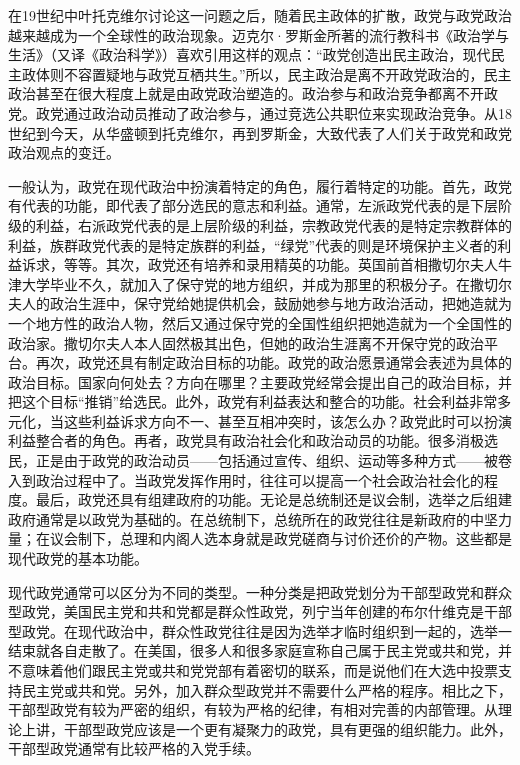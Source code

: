 在19世纪中叶托克维尔讨论这一问题之后，随着民主政体的扩散，政党与政党政治越来越成为一个全球性的政治现象。迈克尔·罗斯金所著的流行教科书《政治学与生活》（又译《政治科学》）喜欢引用这样的观点：“政党创造出民主政治，现代民主政体则不容置疑地与政党互栖共生。”所以，民主政治是离不开政党政治的，民主政治甚至在很大程度上就是由政党政治塑造的。政治参与和政治竞争都离不开政党。政党通过政治动员推动了政治参与，通过竞选公共职位来实现政治竞争。从18世纪到今天，从华盛顿到托克维尔，再到罗斯金，大致代表了人们关于政党和政党政治观点的变迁。

一般认为，政党在现代政治中扮演着特定的角色，履行着特定的功能。首先，政党有代表的功能，即代表了部分选民的意志和利益。通常，左派政党代表的是下层阶级的利益，右派政党代表的是上层阶级的利益，宗教政党代表的是特定宗教群体的利益，族群政党代表的是特定族群的利益，“绿党”代表的则是环境保护主义者的利益诉求，等等。其次，政党还有培养和录用精英的功能。英国前首相撒切尔夫人牛津大学毕业不久，就加入了保守党的地方组织，并成为那里的积极分子。在撒切尔夫人的政治生涯中，保守党给她提供机会，鼓励她参与地方政治活动，把她造就为一个地方性的政治人物，然后又通过保守党的全国性组织把她造就为一个全国性的政治家。撒切尔夫人本人固然极其出色，但她的政治生涯离不开保守党的政治平台。再次，政党还具有制定政治目标的功能。政党的政治愿景通常会表述为具体的政治目标。国家向何处去？方向在哪里？主要政党经常会提出自己的政治目标，并把这个目标“推销”给选民。此外，政党有利益表达和整合的功能。社会利益非常多元化，当这些利益诉求方向不一、甚至互相冲突时，该怎么办？政党此时可以扮演利益整合者的角色。再者，政党具有政治社会化和政治动员的功能。很多消极选民，正是由于政党的政治动员——包括通过宣传、组织、运动等多种方式——被卷入到政治过程中了。当政党发挥作用时，往往可以提高一个社会政治社会化的程度。最后，政党还具有组建政府的功能。无论是总统制还是议会制，选举之后组建政府通常是以政党为基础的。在总统制下，总统所在的政党往往是新政府的中坚力量；在议会制下，总理和内阁人选本身就是政党磋商与讨价还价的产物。这些都是现代政党的基本功能。

现代政党通常可以区分为不同的类型。一种分类是把政党划分为干部型政党和群众型政党，美国民主党和共和党都是群众性政党，列宁当年创建的布尔什维克是干部型政党。在现代政治中，群众性政党往往是因为选举才临时组织到一起的，选举一结束就各自走散了。在美国，很多人和很多家庭宣称自己属于民主党或共和党，并不意味着他们跟民主党或共和党党部有着密切的联系，而是说他们在大选中投票支持民主党或共和党。另外，加入群众型政党并不需要什么严格的程序。相比之下，干部型政党有较为严密的组织，有较为严格的纪律，有相对完善的内部管理。从理论上讲，干部型政党应该是一个更有凝聚力的政党，具有更强的组织能力。此外，干部型政党通常有比较严格的入党手续。

